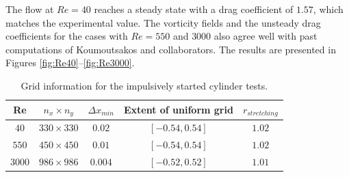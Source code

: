 \documentclass{tufte-handout}
\begin{document}
The flow at $Re=40$ reaches a steady state with a drag coefficient of $1.57$, which matches the experimental value. The vorticity fields and the unsteady drag coefficients for the cases with $Re=550$ and $3000$ also agree well with past computations of Koumoutsakos and collaborators. The results are presented in Figures \ref{fig:Re40}--\ref{fig:Re3000}.


\begin{table}[t]
  \centering
  \selectfont
    \begin{tabular}{ c c c c c}
	\toprule
	Re & $n_x \times n_y$ & $\Delta{x}_{min}$ & Extent of uniform grid & $r_{stretching}$\\
	\midrule
	$40$ & $330 \times 330$ & $0.02$ & $[-0.54,0.54]$ & $1.02$\\	
	$550$ & $450 \times 450$ & $0.01$ & $[-0.54,0.54]$ & $1.02$\\	
	$3000$ & $986 \times 986$ & $0.004$ & $[-0.52,0.52]$ & $1.01$\\
	\bottomrule
    \end{tabular}
    \caption{Grid information for the impulsively started cylinder tests.}\vspace{0.25cm}
    \label{table:gridinfo}
\end{table}
\end{document}
